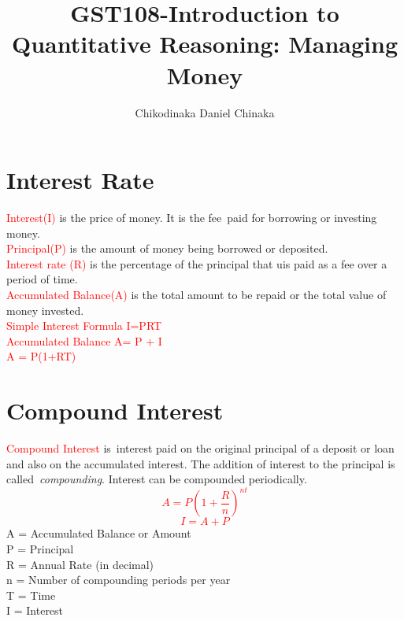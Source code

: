 \documentclass{article}
\begin{document}
	\title{GST108-Introduction to Quantitative Reasoning: Managing Money}
	\author{Chikodinaka Daniel Chinaka}
	\maketitle
	\newpage
	\tableofcontents
	\newpage
	\section{Interest Rate}
	\textcolor{red}{Interest(I)} is the price of money. It is the fee paid for borrowing or investing money.\\
	\textcolor{red}{Principal(P)}
is the amount of money being borrowed or deposited.\\
	\textcolor{red}{Interest rate (R)} is the percentage of the principal that uis paid as a fee over a period of time.\\
	\textcolor{red}{Accumulated Balance(A)} is the total amount to be repaid or the total value of money invested.\\
	\textcolor{red}{Simple Interest Formula I=PRT\\
		Accumulated Balance A= P + I\\
		A = P(1+RT)}
	\newpage
	\section{Compound Interest}
	\textcolor{red}{Compound Interest} is interest paid on the original principal of a deposit or loan and also on the accumulated interest.
	The addition of interest to the principal is called \textit{compounding}.
	Interest can be compounded periodically.
	\textcolor{red}{\begin{equation}
			A=P(1+\frac{R}{n})^{nt}
	\end{equation}}
    \textcolor{red}{\begin{equation}
    		I= A+P
    		\end{equation}}
	A = Accumulated Balance or Amount\\
	P = Principal \\ R = Annual Rate (in decimal)\\ n = Number of compounding periods per year\\
	T = Time\\
	I = Interest
	\newpage
\end{document}
